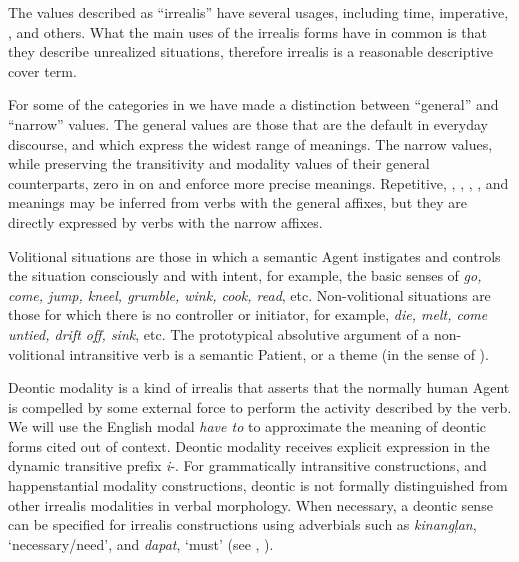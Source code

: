 The values described as “irrealis” have several usages, including  time, imperative, , and others. What the main uses of the irrealis forms have in common is that they describe unrealized situations, therefore irrealis is a reasonable descriptive cover term.

For some of the categories in  we have made a distinction between “general” and “narrow” values. The general values are those that are the default in everyday discourse, and which express the widest range of meanings. The narrow values, while preserving the transitivity and modality values of their general counterparts, zero in on and enforce more precise meanings. Repetitive, , , , , and  meanings may be inferred from verbs with the general affixes, but they are directly expressed by verbs with the narrow affixes.

Volitional situations are those in which a semantic Agent instigates and controls the situation consciously and with intent, for example, the basic senses of \textit{go, come, jump, kneel, grumble, wink, cook, read}, etc. Non-volitional situations are those for which there is no controller or initiator, for example, \textit{die, melt, come untied, drift off, sink}, etc. The prototypical absolutive argument of a non-volitional intransitive verb is a semantic Patient, or a theme (in the sense of \citealt{gruber1965}).

Deontic modality is a kind of irrealis that asserts that the normally human Agent is compelled by some external force to perform the activity described by the verb. We will use the English modal \textit{have to} to approximate the meaning of deontic forms cited out of context. Deontic modality receives explicit expression in the dynamic transitive prefix \textit{i}{}-. For grammatically intransitive constructions, and happenstantial modality constructions, deontic is not formally distinguished from other irrealis modalities in verbal morphology. When necessary, a deontic sense can be specified for irrealis constructions using adverbials such as \textit{kinangļan}, ‘necessary/need’, and \textit{dapat}, ‘must’ (see , ).

